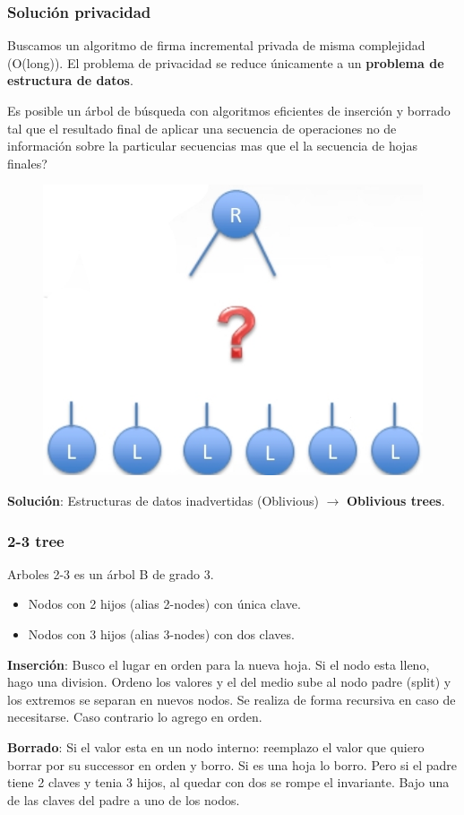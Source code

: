 \documentclass[10pt]{beamer}
\begin{document}
\begin{frame}
\frametitle{Solución privacidad}
Buscamos un algoritmo de firma incremental privada de misma complejidad (O(long)).
El problema de privacidad se reduce únicamente a un \textbf{problema de estructura de datos}.

\pause
Es posible un árbol de búsqueda con algoritmos eficientes de inserción y borrado tal que el
resultado final de aplicar una secuencia de operaciones no de información sobre la particular
secuencias mas que el la secuencia de hojas finales?
\begin{figure}[h!]
    \centering
    \includegraphics[scale=0.2]{conc.jpg}
\end{figure}
\pause
\begin{mdframed}[backgroundcolor=frenchblue!20]
\textbf{Solución}: Estructuras de datos inadvertidas (Oblivious) $\to$ \textbf{Oblivious trees}.
\end{mdframed}
\end{frame}


\begin{frame}
\frametitle{2-3 tree}

Arboles 2-3 es un árbol B de grado 3.
\begin{itemize}
  \item Nodos con 2 hijos (alias 2-nodes) con única clave.
  \item Nodos con 3 hijos (alias 3-nodes) con dos claves.
\end{itemize}

\pause
\textbf{Inserción}: Busco el lugar en orden para la nueva hoja. Si el nodo esta lleno, hago una division.
Ordeno los valores y el del medio sube al nodo padre (split) y los extremos se separan en nuevos nodos.
Se realiza de forma recursiva en caso de necesitarse.
Caso contrario lo agrego en orden.

\pause
\textbf{Borrado}: Si el valor esta en un nodo interno: reemplazo el valor que quiero borrar por su
successor en orden y borro.
Si es una hoja lo borro. Pero si el padre tiene 2 claves y tenia 3 hijos, al quedar con dos se rompe el invariante.
Bajo una de las claves del padre a uno de los nodos.
\end{frame}
\end{document}
